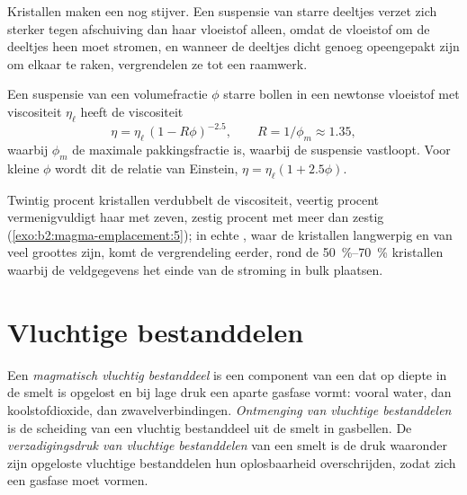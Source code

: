 Kristallen maken een  nog stijver. Een suspensie van starre deeltjes verzet zich
sterker tegen afschuiving dan haar vloeistof alleen, omdat de vloeistof om de
deeltjes heen moet stromen, en wanneer de deeltjes dicht genoeg opeengepakt zijn om elkaar te raken, vergrendelen ze tot een
raamwerk.

\begin{proposition}\label{prop:b2:magma-emplacement:roscoe}
Een suspensie van een volumefractie $\phi$ starre bollen in een newtonse vloeistof
met viscositeit $\eta_{\ell}$ heeft de viscositeit
\[
\eta = \eta_{\ell}\,(1 - R\phi)^{-2.5}, \qquad R = 1/\phi_m \approx 1.35,
\]
waarbij $\phi_m$ de maximale pakkingsfractie is, waarbij de suspensie vastloopt. Voor
kleine $\phi$ wordt dit de relatie van Einstein, $\eta = \eta_{\ell}(1 + 2.5\phi)$.
\end{proposition}
\admitted

Twintig procent kristallen verdubbelt de viscositeit, veertig procent vermenigvuldigt haar met
zeven, zestig procent met meer dan zestig (\cref{exo:b2:magma-emplacement:5}); in echte , waar de
kristallen langwerpig en van veel groottes zijn, komt de vergrendeling eerder, rond de
\qtyrange{50}{70}{\percent} kristallen waarbij de veldgegevens het
einde van de stroming in bulk plaatsen.

\section{Vluchtige bestanddelen}

\begin{definition}\label{def:b2:magma-emplacement:volatiles}
Een \emph{magmatisch vluchtig bestanddeel} is een component van een  dat
op diepte in de smelt is opgelost en bij lage druk een aparte gasfase vormt:
vooral water, dan koolstofdioxide, dan zwavelverbindingen. \emph{Ontmenging van vluchtige
bestanddelen} is de scheiding van een vluchtig bestanddeel uit de
smelt in gasbellen. De \emph{verzadigingsdruk van vluchtige
bestanddelen} van een smelt is de druk waaronder
zijn opgeloste vluchtige bestanddelen hun oplosbaarheid overschrijden, zodat zich een gasfase moet vormen.
\end{definition}

